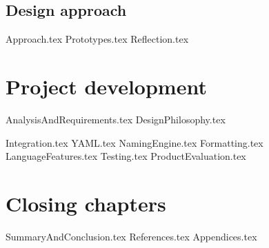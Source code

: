 \documentclass{article} %
\begin{document}
\subsection{Design approach}
{Approach.tex}
{Prototypes.tex}
{Reflection.tex}

\newpage
\section{Project development}
{AnalysisAndRequirements.tex}
{DesignPhilosophy.tex}

{Integration.tex}
{YAML.tex}
{NamingEngine.tex}
{Formatting.tex}
{LanguageFeatures.tex}
{Testing.tex}
{ProductEvaluation.tex}

\newpage
\section{Closing chapters} %
{SummaryAndConclusion.tex}
{References.tex}
{Appendices.tex}
\end{document}
